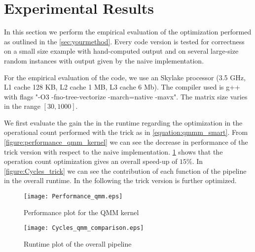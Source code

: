 \section{Experimental Results}\label{sec:exp}
\graphicspath{{../../plots/}}

In this section we perform the empirical evaluation of the optimization performed as outlined in the \cref{sec:yourmethod}. Every code version is tested for correctness on a small size example with hand-computed output and on several large-size random instances with output given by the naive implementation.

\begin{comment}
Specify the platform (processor, frequency, cache sizes)
as well as the compiler, version, and flags used. I strongly recommend that you play with optimization flags and consider also icc for additional potential speedup.

Then explain what input you used and what range of sizes. The idea is to give enough information so the experiments are reproducible by somebody else on his or her code.
\end{comment}
For the empirical evaluation of the code, we use an Skylake processor (3.5 GHz, L1 cache 128 KB, L2 cache 1 MB, L3 cache 6 Mb). The compiler used is g++ with flags "-O3 -fno-tree-vectorize -march=native -mavx". The matrix size varies in the range $[30,1000]$.

We first evaluate the gain the in the runtime regarding the optimization in the operational count performed with the trick as in \cref{equation:qmmm_smart}. From \cref{figure:performance_qmm_kernel} we can see the decrease in performance of the trick version with respect to the naive implementation. \cref{figure:cycles_qmm_comparison} shows that the operation count optimization gives an overall speed-up of $15 \%$. In \cref{figure:Cycles_trick} we can see the contribution of each function of the pipeline in the overall runtime. In the following the trick version is further optimized.

\begin{figure}[h]
\texttt{[image: Performance\_qmm.eps]}
\caption{Performance plot for the QMM kernel}
\label{figure:performance_qmm_kernel}

\texttt{[image: Cycles\_qmm\_comparison.eps]}
\caption{Runtime plot of the overall pipeline}
\label{figure:cycles_qmm_comparison}
\end{figure}


